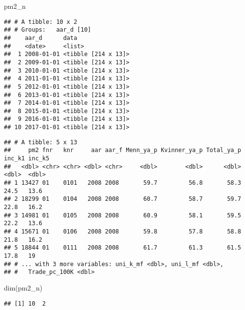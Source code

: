\documentclass[
]{article}
\newenvironment{Shaded}{\begin{snugshade}}{\end{snugshade}}
\newcommand{\AttributeTok}[1]{\textcolor[rgb]{0.77,0.63,0.00}{#1}}
\newcommand{\CommentTok}[1]{\textcolor[rgb]{0.56,0.35,0.01}{\textit{#1}}}
\newcommand{\DecValTok}[1]{\textcolor[rgb]{0.00,0.00,0.81}{#1}}
\newcommand{\FunctionTok}[1]{\textcolor[rgb]{0.00,0.00,0.00}{#1}}
\newcommand{\NormalTok}[1]{#1}
\newcommand{\SpecialCharTok}[1]{\textcolor[rgb]{0.00,0.00,0.00}{#1}}
\begin{document}
\begin{Shaded}
\begin{Highlighting}[]
\NormalTok{pm2\_n}
\end{Highlighting}
\end{Shaded}

\begin{verbatim}
## # A tibble: 10 x 2
## # Groups:   aar_d [10]
##    aar_d      data               
##    <date>     <list>             
##  1 2008-01-01 <tibble [214 x 13]>
##  2 2009-01-01 <tibble [214 x 13]>
##  3 2010-01-01 <tibble [214 x 13]>
##  4 2011-01-01 <tibble [214 x 13]>
##  5 2012-01-01 <tibble [214 x 13]>
##  6 2013-01-01 <tibble [214 x 13]>
##  7 2014-01-01 <tibble [214 x 13]>
##  8 2015-01-01 <tibble [214 x 13]>
##  9 2016-01-01 <tibble [214 x 13]>
## 10 2017-01-01 <tibble [214 x 13]>
\end{verbatim}

\begin{Shaded}
\end{Shaded}

\begin{verbatim}
## # A tibble: 5 x 13
##     pm2 fnr   knr     aar aar_f Menn_ya_p Kvinner_ya_p Total_ya_p inc_k1 inc_k5
##   <dbl> <chr> <chr> <dbl> <chr>     <dbl>        <dbl>      <dbl>  <dbl>  <dbl>
## 1 13427 01    0101   2008 2008       59.7         56.8       58.3   24.5   13.6
## 2 18299 01    0104   2008 2008       60.7         58.7       59.7   22.8   16.2
## 3 14981 01    0105   2008 2008       60.9         58.1       59.5   22.2   13.6
## 4 15671 01    0106   2008 2008       59.8         57.8       58.8   21.8   16.2
## 5 18844 01    0111   2008 2008       61.7         61.3       61.5   17.8   19  
## # ... with 3 more variables: uni_k_mf <dbl>, uni_l_mf <dbl>,
## #   Trade_pc_100K <dbl>
\end{verbatim}

\begin{Shaded}
\begin{Highlighting}[]
\FunctionTok{dim}\NormalTok{(pm2\_n)}
\end{Highlighting}
\end{Shaded}

\begin{verbatim}
## [1] 10  2
\end{verbatim}
\end{document}
